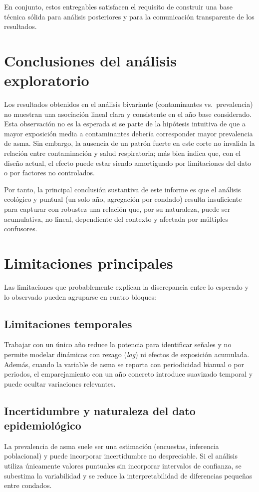 En conjunto, estos entregables satisfacen el requisito de construir una base técnica sólida para análisis
posteriores y para la comunicación transparente de los resultados.

\section{Conclusiones del análisis exploratorio}
Los resultados obtenidos en el análisis bivariante (contaminantes vs.\ prevalencia) no muestran una asociación
lineal clara y consistente en el año base considerado. Esta observación no es la esperada si se parte de la
hipótesis intuitiva de que a mayor exposición media a contaminantes debería corresponder mayor prevalencia de asma.
Sin embargo, la ausencia de un patrón fuerte en este corte no invalida la relación entre contaminación y salud
respiratoria; más bien indica que, con el diseño actual, el efecto puede estar siendo amortiguado por limitaciones
del dato o por factores no controlados.

Por tanto, la principal conclusión sustantiva de este informe es que el análisis ecológico y puntual (un solo año,
agregación por condado) resulta insuficiente para capturar con robustez una relación que, por su naturaleza, puede
ser acumulativa, no lineal, dependiente del contexto y afectada por múltiples confusores.

\section{Limitaciones principales}
Las limitaciones que probablemente explican la discrepancia entre lo esperado y lo observado pueden agruparse en
cuatro bloques:

\subsection{Limitaciones temporales}
Trabajar con un único año reduce la potencia para identificar señales y no permite modelar dinámicas con rezago
(\textit{lag}) ni efectos de exposición acumulada. Además, cuando la variable de asma se reporta con periodicidad
bianual o por periodos, el emparejamiento con un año concreto introduce suavizado temporal y puede ocultar
variaciones relevantes.

\subsection{Incertidumbre y naturaleza del dato epidemiológico}
La prevalencia de asma suele ser una estimación (encuestas, inferencia poblacional) y puede incorporar incertidumbre
no despreciable. Si el análisis utiliza únicamente valores puntuales sin incorporar intervalos de confianza, se
subestima la variabilidad y se reduce la interpretabilidad de diferencias pequeñas entre condados.

